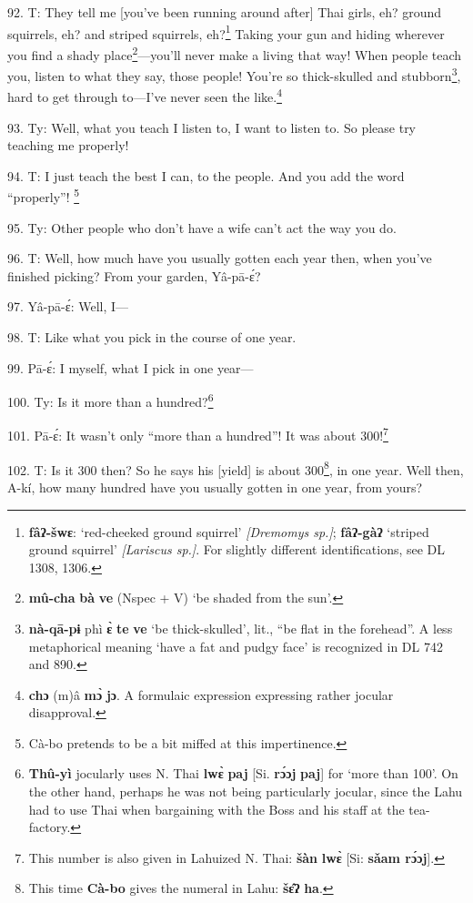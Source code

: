 92. T: They tell me [you've been running around after] Thai girls, eh? ground
squirrels, eh? and striped squirrels, eh?\footnote{\textbf{fâʔ-šwɛ}: `red-cheeked ground squirrel' \textit{[Dremomys sp.]}; \textbf{fâʔ-gàʔ} `striped ground squirrel' \textit{[Lariscus sp.]}. For slightly different identifications, see DL 1308, 1306.} Taking your gun and hiding wherever
you find a shady place\footnote{\textbf{mû-cha} \textbf{bà} \textbf{ve} (Nspec + V) `be shaded from the sun'.}---you'll never make a living that way! When people
teach you, listen to what they say, those people! You're so thick-skulled and
stubborn\footnote{\textbf{nà-qā-pɨ} phì \textbf{ɛ̀} \textbf{te} \textbf{ve} `be thick-skulled', lit., ``be flat in the forehead''. A less metaphorical meaning `have a fat and pudgy face' is recognized in DL 742 and 890.}, hard to get through to---I've never seen the like.\footnote{\textbf{chɔ} (m)â \textbf{mɔ̀} \textbf{jɔ}. A formulaic expression expressing rather jocular disapproval.}

93. Ty: Well, what you teach I listen to, I want to listen to. So please try
teaching me properly!

94. T: I just teach the best I can, to the people. And you add the word ``properly''!
\footnote{Cà-bo pretends to be a bit miffed at this impertinence.}

95. Ty: Other people who don't have a wife can't act the way you do.

96. T: Well, how much have you usually gotten each year then, when you've finished
picking? From your garden, Yâ-pā-ɛ́?

97. Yâ-pā-ɛ́: Well, I---

98. T: Like what you pick in the course of one year.

99. Pā-ɛ́: I myself, what I pick in one year---

100. Ty: Is it more than a hundred?\footnote{\textbf{Thû-yì} jocularly uses N. Thai \textbf{lwɛ̀} \textbf{paj} [Si. \textbf{rɔ́ɔj} \textbf{paj}] for `more than 100'. On the other hand, perhaps he was not being particularly jocular, since the Lahu had to use Thai when bargaining with the Boss and his staff at the tea-factory.}

101. Pā-ɛ́: It wasn't only ``more than a hundred''! It was about 300!\footnote{This number is also given in Lahuized N. Thai: \textbf{šàn} \textbf{lwɛ̀} [Si: \textbf{sǎam rɔ́ɔj}].}

102. T: Is it 300 then? So he says his [yield] is about 300\footnote{This time \textbf{Cà-bo} gives the numeral in Lahu: \textbf{šɛ̂ʔ} \textbf{ha}.}, in one year.
Well then, A-kí, how many hundred have you usually gotten in one year, from yours?

